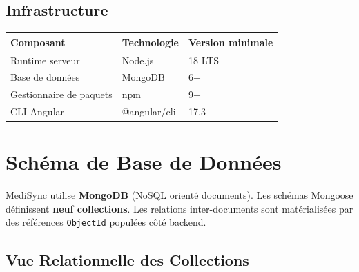\documentclass[12pt,a4paper]{report}
\begin{document}
\section{Infrastructure}

\begin{center}
\small
\begin{tabular}{@{} l l l @{}}
  \toprule
  \textbf{Composant}        & \textbf{Technologie}  & \textbf{Version minimale} \\
  \midrule
  Runtime serveur           & Node.js               & 18 LTS \\
  Base de données           & MongoDB               & 6+ \\
  Gestionnaire de paquets   & npm                   & 9+ \\
  CLI Angular               & @angular/cli          & 17.3 \\
  \bottomrule
\end{tabular}
\end{center}

\chapter{Schéma de Base de Données}

MediSync utilise \textbf{MongoDB} (NoSQL orienté documents). Les schémas Mongoose définissent \textbf{neuf collections}. Les relations inter-documents sont matérialisées par des références \texttt{ObjectId} populées côté backend.

\section{Vue Relationnelle des Collections}
\end{document}
